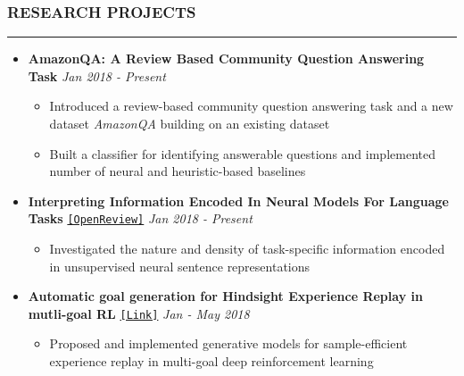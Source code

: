 \documentclass[10pt,a4paper,English]{article}
\newcommand\roottitle[1]{\vspace{-4mm}\subsubsection*{\uppercase{#1}}\vspace{-0.3em}\nopagebreak[4]\hrule\vspace{4mm}}
\newcommand\itemyear[1]{\hfill \emph{\color{itemyear} #1}}
\newcommand\itemenv{\setlength\itemsep{0.5pt} \addtolength{\itemindent}{-5mm}\vspace{-1.5mm}}
\begin{document}
\roottitle{Research Projects}
\begin{itemize} \itemenv
    \item \textbf{AmazonQA: A Review Based Community Question Answering Task} 
    \itemyear{Jan 2018 - Present}
        \begin{itemize} \itemenv
            \item Introduced a review-based community question answering task 
            and a new dataset \textit{AmazonQA} building on an existing dataset
            \item Built a classifier for identifying answerable questions and implemented number of neural and heuristic-based baselines
        \end{itemize}

    \item \textbf{Interpreting Information Encoded In Neural Models For Language Tasks}
        \href{https://openreview.net/pdf?id=Hye64hA9tm}{\texttt{[OpenReview]}} 
        \itemyear{Jan 2018 - Present}
    \begin{itemize} \itemenv
        \item Investigated the nature and density of task-specific information encoded in unsupervised neural sentence representations
    \end{itemize}
    
    \item \textbf{Automatic goal generation for Hindsight Experience Replay in mutli-goal RL} \href{https://github.com/nitish-kulkarni/Automatic-Hindsight-Experience-Replay}{\texttt{[Link]}} \itemyear{Jan - May 2018}
        \begin{itemize} \itemenv
            \item Proposed and implemented generative models for sample-efficient experience replay in multi-goal deep reinforcement learning
        \end{itemize}


\end{itemize}
\end{document}

